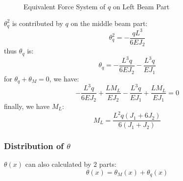 \begin{figure}[H]
    \centering
    \caption{Equivalent Force System of $q$ on Left Beam Part}
    \label{fig:problem2_equivalent_force_system}
\end{figure}
$\theta_q^2$ is contributed by $q$ on the middle beam part:
\begin{equation}
    \theta_q^2 = -\frac{qL^3}{6EJ_2}
\end{equation}
thus $\theta_q$ is:
\begin{equation}
    \theta_q = - \frac{L^{3} q}{6 E J_{2}} - \frac{L^{3} q}{E J_{1}}
\end{equation}
for $\theta_q + \theta_M = 0$, we have:
\begin{equation}
    - \frac{L^{3} q}{6 E J_{2}} + \frac{L M_{L}}{E J_{2}} - \frac{L^{3} q}{E J_{1}} + \frac{L M_{L}}{E J_{1}} = 0
\end{equation}
finally, we have $M_L$:
\begin{equation}
    M_{L} = \frac{L^{2} q \left(J_{1} + 6 J_{2}\right)}{6 \left(J_{1} + J_{2}\right)}
\end{equation}

\subsubsection{Distribution of $\theta$}

$\theta(x)$ can also calculated by $2$ parts:
\begin{equation}
    \theta(x) = \theta_M(x) + \theta_q(x)
\end{equation}

